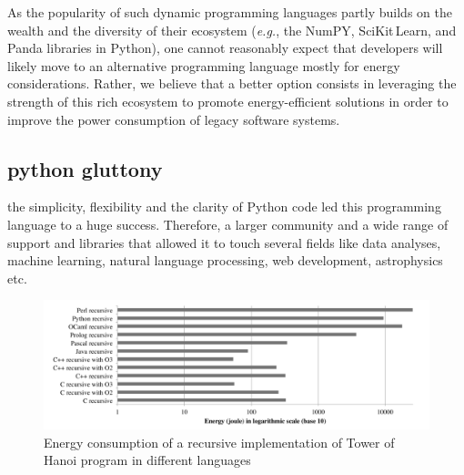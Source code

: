 As the popularity of such dynamic programming languages partly builds on the wealth and the diversity of their ecosystem (\emph{e.g.}, the NumPY, SciKit\,Learn, and Panda libraries in Python), one cannot reasonably expect that developers will likely move to an alternative programming language mostly for energy considerations.
Rather, we believe that a better option consists in leveraging the strength of this rich ecosystem to promote energy-efficient solutions in order to improve the power consumption of legacy software systems.









\subsection{python gluttony}

the simplicity, flexibility and the clarity of Python code led this programming language to a huge success. Therefore, a larger community and a wide range of support and libraries that allowed it to touch several fields like data analyses, machine learning, natural language processing, web development, astrophysics etc.
\begin{figure}[htbp]
    \includegraphics[width=\linewidth]{imgs/hannoiimplementation.png}
    \caption{Energy consumption of a recursive implementation of Tower of Hanoi program in different languages~\cite{noureddine_preliminary_2012}}
    \label{fig:hannoi}
\end{figure}

